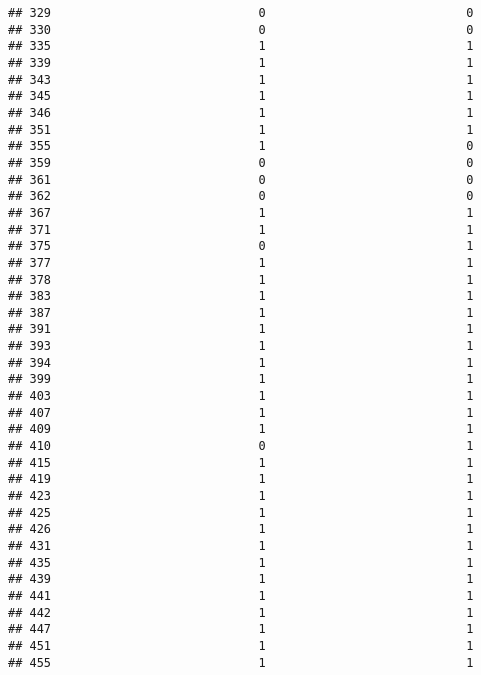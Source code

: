 \documentclass[
]{article}
\begin{document}
\begin{verbatim}
## 329                             0                            0
## 330                             0                            0
## 335                             1                            1
## 339                             1                            1
## 343                             1                            1
## 345                             1                            1
## 346                             1                            1
## 351                             1                            1
## 355                             1                            0
## 359                             0                            0
## 361                             0                            0
## 362                             0                            0
## 367                             1                            1
## 371                             1                            1
## 375                             0                            1
## 377                             1                            1
## 378                             1                            1
## 383                             1                            1
## 387                             1                            1
## 391                             1                            1
## 393                             1                            1
## 394                             1                            1
## 399                             1                            1
## 403                             1                            1
## 407                             1                            1
## 409                             1                            1
## 410                             0                            1
## 415                             1                            1
## 419                             1                            1
## 423                             1                            1
## 425                             1                            1
## 426                             1                            1
## 431                             1                            1
## 435                             1                            1
## 439                             1                            1
## 441                             1                            1
## 442                             1                            1
## 447                             1                            1
## 451                             1                            1
## 455                             1                            1

\end{verbatim}
\end{document}
